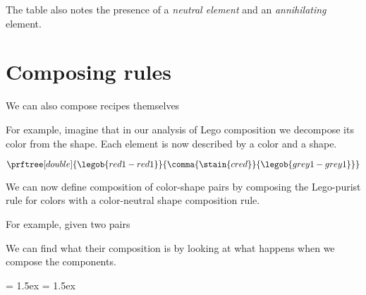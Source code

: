 The table also notes the presence of a \emph{neutral element} and an \emph{annihilating} element.


%



\section{Composing rules}

We can also compose recipes themselves

For example, imagine that in our analysis of Lego composition we decompose its color from the shape.
Each element is now described by a color and a shape.

\begin{equation}
  \label{eq:color-and-shape}
  \prftree[double]{\legob{red1-red1}}{\comma{\stain{cred}}{\legob{grey1-grey1}}}
\end{equation}

We can now define composition of color-shape pairs by composing the Lego-purist rule for colors with a color-neutral shape composition rule.

For example, given two pairs
%
\begin{center}
\qqand
{}
\end{center}


%
We can find what their composition is by looking at what happens when we compose the components.

\begin{center}
\prfinterspace=1cm
\prflinepadbefore = 1.5ex
\prflinepadafter = 1.5ex
\end{center}

